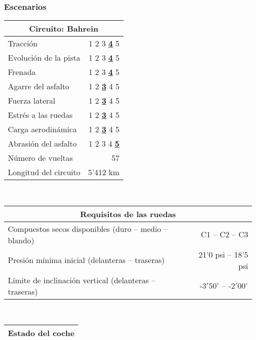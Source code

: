 \documentclass[12pt,a4paper,twoside,spanish]{article}      %
\begin{document}
\subsubsection{Escenarios}

\begin{table}[H]
    \centering
    \begin{tabular}{lr}
        \toprule
        \multicolumn{2}{c}{Circuito: \textbf{Bahrein}} \\ \midrule
        Tracción & 1 2 3 \underline{\textbf{4}} 5 \\
        Evolución de la pista & 1 2 3 \underline{\textbf{4}} 5 \\
        Frenada & 1 2 3 \underline{\textbf{4}} 5 \\
        Agarre del asfalto & 1 2 \underline{\textbf{3}} 4 5 \\
        Fuerza lateral & 1 2 \underline{\textbf{3}} 4 5 \\
        Estrés a las ruedas & 1 2 \underline{\textbf{3}} 4 5 \\
        Carga aerodinámica & 1 2 \underline{\textbf{3}} 4 5 \\
        Abrasión del asfalto & 1 2 3 4 \underline{\textbf{5}} \\
        Número de vueltas & 57 \\
        Longitud del circuito & 5'412 km \\ \bottomrule
    \end{tabular} \\ \vspace{1em}
    \begin{tabular}{lr}
        \toprule
        \multicolumn{2}{c}{\textbf{Requisitos de las ruedas}} \\ \midrule
        Compuestos secos disponibles (duro -- medio -- blando) & C1 -- C2 -- C3 \\
        Presión mínima inicial (delanteras -- traseras) & 21'0 psi -- 18'5 psi \\
        Límite de inclinación vertical (delanteras -- traseras) & -$3'50^\circ$ -- -$2'00^\circ$ \\ \bottomrule
    \end{tabular} \\ \vspace{1em}
    \begin{tabular}{lr}
        \toprule
        \multicolumn{2}{c}{\textbf{Estado del coche}} \\ \midrule

\end{tabular}
\end{table}
\end{document}
